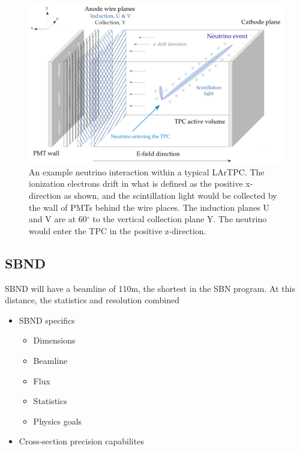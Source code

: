     \begin{figure}[h!]
        \center
        \includegraphics[width=\textwidth]{images/LArTPC.pdf}
        \caption{An example neutrino interaction within a typical LArTPC. The ionization electrons drift in what is defined as the positive x-direction as shown, and the scintillation light would be collected by the wall of PMTs behind the wire places. The induction planes U and V are at 60$^{\circ}$ to the vertical collection plane Y. The neutrino would enter the TPC in the positive z-direction.}
        \label{fig:lartpc}
    \end{figure}

\subsection{SBND}    

    SBND will have a beamline of 110m, the shortest in the SBN program. At this distance, the statistics and resolution combined 
    
    \begin{itemize}
    
        \item SBND specifics

        \begin{itemize}

            \item Dimensions
            \item Beamline
            \item Flux
            \item Statistics
            \item Physics goals

        \end{itemize}
        
        \item Cross-section precision capabilites

    \end{itemize}


